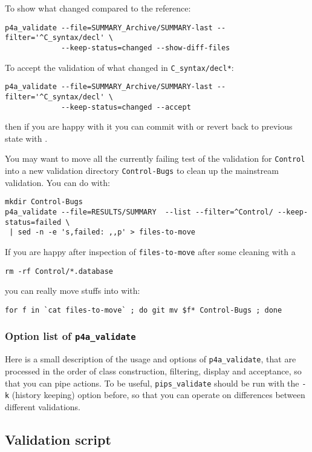 \documentclass[a4paper]{article}
\begin{document}
To show what changed compared to the reference:
\begin{verbatim}
p4a_validate --file=SUMMARY_Archive/SUMMARY-last --filter='^C_syntax/decl' \
             --keep-status=changed --show-diff-files
\end{verbatim}

To accept the validation of what changed in \texttt{C\_syntax/decl\emph{*}}:
\begin{verbatim}
p4a_validate --file=SUMMARY_Archive/SUMMARY-last --filter='^C_syntax/decl' \
             --keep-status=changed --accept
\end{verbatim}
then if you are happy with it you can commit with \Agit or revert back to
previous state with \Agit.

You may want to move all the currently failing test of the validation for
\texttt{Control} into a new validation directory \texttt{Control-Bugs} to
clean up the mainstream validation. You can do with:
\begin{verbatim}
mkdir Control-Bugs
p4a_validate --file=RESULTS/SUMMARY  --list --filter=^Control/ --keep-status=failed \
 | sed -n -e 's,failed: ,,p' > files-to-move
\end{verbatim}
If you are happy after inspection of \texttt{files-to-move} after some
cleaning with a
\begin{verbatim}
rm -rf Control/*.database
\end{verbatim}
you can really move stuffs into with:
\begin{verbatim}
for f in `cat files-to-move` ; do git mv $f* Control-Bugs ; done
\end{verbatim}


\subsubsection{Option list of \protect\texttt{p4a\_validate}}
\label{sec:opti-list-p4a_v-1}

Here is a small description of the usage and options of
\verb|p4a_validate|, that are processed in the order of class
construction, filtering, display and acceptance, so that you can pipe
actions. To be useful, \verb|pips_validate| should be run with the
\texttt{-k} (history keeping) option before, so that you can operate on
differences between different validations.




\subsection{Validation script}
\label{sec:validation_script}
\end{document}
